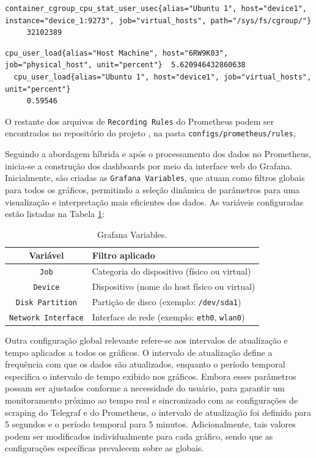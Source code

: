 {\begin{lstlisting}[caption={Métricas de CPU - Carga de usuário obtidas do Telegraf}, label={lst:telegraf-cpu-user-load}]
  container_cgroup_cpu_stat_user_usec{alias="Ubuntu 1", host="device1", instance="device_1:9273", job="virtual_hosts", path="/sys/fs/cgroup/"}
     32102389
\end{lstlisting}

\begin{lstlisting}[caption={Métricas Normalizadas no Prometheus}, label={lst:normalized-cpu-user-load}]
  cpu_user_load{alias="Host Machine", host="6RW9K03", job="physical_host", unit="percent"}	5.620946432860638 
  cpu_user_load{alias="Ubuntu 1", host="device1", job="virtual_hosts", unit="percent"}	
     0.59546
\end{lstlisting}

O restante dos arquivos de \verb|Recording Rules| do Prometheus podem ser encontrados no repositório do projeto \citep{vitorcossetti2025}, na pasta \verb|configs/prometheus/rules|, 

Seguindo a abordagem híbrida e após o processamento dos dados no Prometheus, inicia-se a construção dos dashboards por meio da interface web do Grafana. Inicialmente, são criadas as \verb|Grafana Variables|, que atuam como filtros globais para todos os gráficos, permitindo a seleção dinâmica de parâmetros para uma visualização e interpretação mais eficientes dos dados. As variáveis configuradas estão listadas na Tabela \ref{tab:grafana-variables}:

\begin{table}[H]
\centering
\caption{Grafana Variables.}
\label{tab:grafana-variables}
\color{red}
\begin{tabular}{cl}
\toprule
\textbf{Variável} & \textbf{Filtro aplicado} \\
\midrule
\verb|Job| & Categoria do dispositivo (físico ou virtual) \\
\verb|Device| & Dispositivo (nome do host físico ou virtual) \\
\verb|Disk Partition| & Partição de disco (exemplo: \verb|/dev/sda1|) \\
\verb|Network Interface| & Interface de rede (exemplo: \verb|eth0|, \verb|wlan0|) \\
\bottomrule
\end{tabular}
\end{table}

Outra configuração global relevante refere-se aos intervalos de atualização e tempo aplicados a todos os gráficos. O intervalo de atualização define a frequência com que os dados são atualizados, enquanto o período temporal especifica o intervalo de tempo exibido nos gráficos. Embora esses parâmetros possam ser ajustados conforme a necessidade do usuário, para garantir um monitoramento próximo ao tempo real e sincronizado com as configurações de scraping do Telegraf e do Prometheus, o intervalo de atualização foi definido para 5 segundos e o período temporal para 5 minutos. Adicionalmente, tais valores podem ser modificados individualmente para cada gráfico, sendo que as configurações específicas prevalecem sobre as globais.


}
